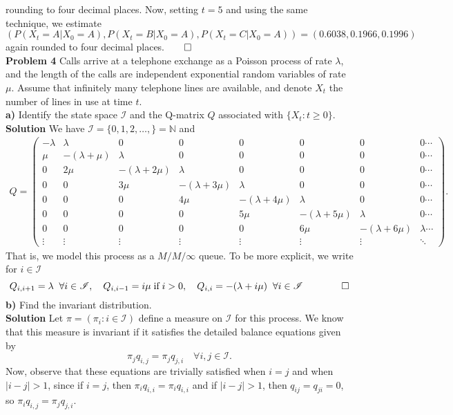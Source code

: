 \documentclass[11pt, letterpaper]{article}
\newcommand{\mbb}[1]{\mathbb{#1}}
\newcommand{\mc}[1]{\mathcal{#1}}
\begin{document}
    rounding to four decimal places. Now, setting $t=5$ and using the same technique, we estimate
    \[(P(X_t=A|X_0=A), P(X_t=B|X_0=A), P(X_t=C|X_0=A))=(0.6038, 0.1966, 0.1996)\]
    again rounded to four decimal places.\hfill{$\qed$}\\[10pt]
    {\bf Problem 4} Calls arrive at a telephone exchange as a Poisson process of rate $\lambda$, and the length of the calls are independent exponential random variables
    of rate $\mu$. Assume that infinitely many telephone lines are available, and denote $X_t$ the number of lines in use at time $t$.\\[10pt]
    {\bf a)} Identify the state space $\mc{I}$ and the Q-matrix $Q$ associated with $\{X_t:t\geq 0\}$.\\[10pt]
    {\bf Solution} We have $\mc{I}=\{0,1,2,\dots,\}=\mbb{N}$ and
    \begin{align*}
        Q=\begin{pmatrix}
            -\lambda & \lambda & 0 & 0 & 0 & 0 & 0 & 0\cdots\\
            \mu & -(\lambda +\mu) & \lambda & 0 & 0 & 0 & 0 & 0\cdots\\
            0 & 2\mu & -(\lambda+2\mu) & \lambda & 0 & 0 & 0 & 0\cdots\\
            0 & 0 & 3\mu & -(\lambda +3\mu) & \lambda & 0 & 0 & 0\cdots\\
            0 & 0 & 0 & 4\mu & -(\lambda+4\mu) & \lambda & 0 & 0\cdots\\
            0 & 0 & 0 & 0 & 5\mu & -(\lambda+5\mu) & \lambda & 0\cdots\\
            0 & 0 & 0 & 0 & 0 & 6\mu & -(\lambda+6\mu) & \lambda\cdots\\
            \vdots & \vdots & \vdots & \vdots & \vdots & \vdots & \vdots & \ddots
        \end{pmatrix}.
    \end{align*}
    That is, we model this process as a $M/M/\infty$ queue. To be more explicit, we write for $i\in\mc{I}$
    \[Q_{i,i+1}=\lambda\;\;\forall i\in\mc{I},\quad Q_{i,i-1}=i\mu\;\text{if\;}i>0,\quad Q_{i,i}=-(\lambda+i\mu)\;\;\forall i\in\mc{I}\tag*{$\qed$}\]
    {\bf b)} Find the invariant distribution.\\[10pt]
    {\bf Solution} Let $\pi=(\pi_i:i\in\mc{I})$ define a measure on $\mc{I}$ for this process. We know that this measure is invariant if it satisfies the detailed balance equations given by
    \[\pi_jq_{i,j}=\pi_jq_{j,i}\quad\forall i,j\in\mc{I}.\]
    Now, observe that these equations are trivially satisfied when $i=j$ and when $|i-j|>1$, since if $i=j$, then $\pi_iq_{i,i}=\pi_iq_{i,i}$ and if $|i-j|>1$, then $q_{ij}=q_{ji}=0$, so $\pi_iq_{i,j}=\pi_jq_{j,i}$.
\end{document}
